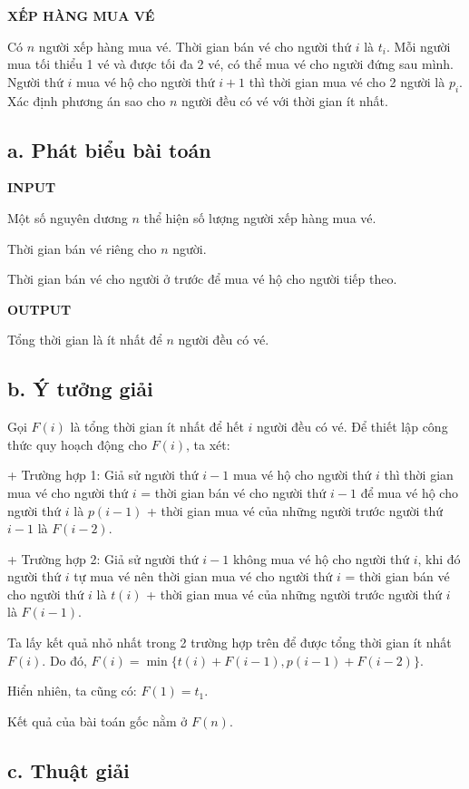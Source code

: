 \documentclass[12pt, a4paper, fleqn]{article}
\begin{document}
	\textbf{XẾP HÀNG MUA VÉ}
	
	Có $n$ người xếp hàng mua vé. Thời gian bán vé cho người thứ $i$ là $t_i$. Mỗi người mua tối thiểu 1 vé và được tối đa 2 vé, có thể mua vé cho người đứng sau mình. Người thứ $i$ mua vé hộ cho người thứ $i + 1$ thì thời gian mua vé cho 2 người là $p_i$. Xác định phương án sao cho $n$ người đều có vé với thời gian ít nhất.
	
	\subsection*{a. Phát biểu bài toán}
	
	\textbf{INPUT}
	
	Một số nguyên dương $n$ thể hiện số lượng người xếp hàng mua vé.
	
	Thời gian bán vé riêng cho $n$ người.
	
	Thời gian bán vé cho người ở trước để mua vé hộ cho người tiếp theo.
	
	\textbf{OUTPUT}
	
	Tổng thời gian là ít nhất để $n$ người đều có vé.
	
	\subsection*{b. Ý tưởng giải}
	
	Gọi $F(i)$ là tổng thời gian ít nhất để hết $i$ người đều có vé. Để thiết lập công thức quy hoạch động cho $F(i)$, ta xét:

	+ Trường hợp 1: Giả sử người thứ $i - 1$ mua vé hộ cho người thứ $i$ thì thời gian mua vé cho người thứ $i$ = thời gian bán vé cho người thứ $i - 1$ để mua vé hộ cho người thứ $i$ là $p(i - 1)$ + thời gian mua vé của những người trước người thứ $i - 1$ là $F(i - 2)$.
	
	+ Trường hợp 2: Giả sử người thứ $i - 1$ không mua vé hộ cho người thứ $i$, khi đó người thứ $i$ tự mua vé nên thời gian mua vé cho người thứ $i$ = thời gian bán vé cho người thứ $i$ là $t(i)$ + thời gian mua vé của những người trước người thứ $i$ là $F(i - 1)$.
	
	Ta lấy kết quả nhỏ nhất trong 2 trường hợp trên để được tổng thời gian ít nhất $F(i)$. Do đó, $F(i) = \min\{t(i) + F(i - 1), p(i - 1) + F(i - 2)\}$.
	
	Hiển nhiên, ta cũng có: $F(1) = t_1$.
	
	Kết quả của bài toán gốc nằm ở $F(n)$.
	
	\subsection*{c. Thuật giải}
	
\end{document}
